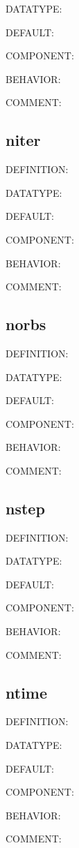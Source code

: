 {\color{green}DATATYPE:}

{\color{blue}DEFAULT:}

{\color{brown}COMPONENT:}

{\color{purple}BEHAVIOR:}

{\color{olive}COMMENT:}

\subsection{niter}
{\color{red}DEFINITION:}

{\color{green}DATATYPE:}

{\color{blue}DEFAULT:}

{\color{brown}COMPONENT:}

{\color{purple}BEHAVIOR:}

{\color{olive}COMMENT:}

\subsection{norbs}
{\color{red}DEFINITION:}

{\color{green}DATATYPE:}

{\color{blue}DEFAULT:}

{\color{brown}COMPONENT:}

{\color{purple}BEHAVIOR:}

{\color{olive}COMMENT:}

\subsection{nstep}
{\color{red}DEFINITION:}

{\color{green}DATATYPE:}

{\color{blue}DEFAULT:}

{\color{brown}COMPONENT:}

{\color{purple}BEHAVIOR:}

{\color{olive}COMMENT:}

\subsection{ntime}
{\color{red}DEFINITION:}

{\color{green}DATATYPE:}

{\color{blue}DEFAULT:}

{\color{brown}COMPONENT:}

{\color{purple}BEHAVIOR:}

{\color{olive}COMMENT:}

